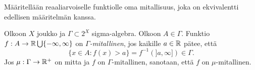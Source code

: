 \documentclass[12pt,oneside,a4paper]{amsbook} %
\begin{document}
Määritellään reaaliarvoiselle funktiolle oma mitallisuus, joka on ekvivalentti edellisen määritelmän kanssa.

\begin{definition}
     Olkoon $X$ joukko ja $\Gamma \subset 2^X$ sigma-algebra. Olkoon $A\in \Gamma$. Funktio $f: A \to \mathbb{R} \bigcup\{-\infty, \infty\}$ on \textit{$\Gamma$-mitallinen}, jos kaikille $a \in \mathbb{R}$ pätee, että
    \begin{equation*}
        \{x \in A : f(x) > a\} = f^{-1}(]a, \infty]) \in \Gamma.
    \end{equation*} 
    Jos $\mu:\Gamma \to {\mathbb{R}^{+}}$ on mitta ja $f$ on $\Gamma$-mitallinen, sanotaan, että $f$ on $\mu$-mitallinen.
    
\end{definition}
\end{document}
